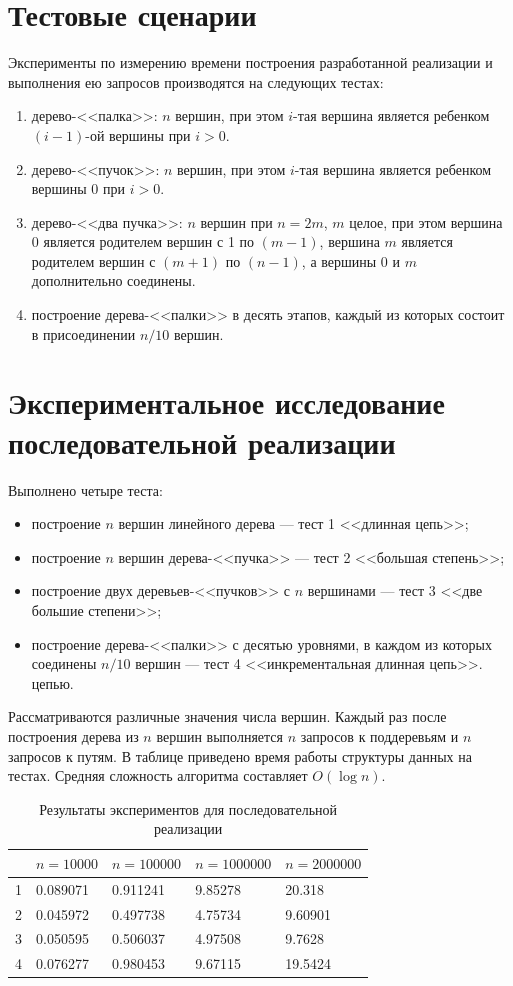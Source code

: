 \documentclass[specification,annotation]{itmo-student-thesis}
\begin{document}
\section{Тестовые сценарии}

Эксперименты по измерению времени построения разработанной реализации и выполнения ею запросов производятся на следующих тестах:
\begin{enumerate}
    \item дерево-<<палка>>: $n$ вершин, при этом $i$-тая вершина является ребенком $(i-1)$-ой вершины при $i > 0$.
    \item дерево-<<пучок>>: $n$ вершин, при этом $i$-тая вершина является ребенком вершины 0 при $i > 0$.
    \item дерево-<<два пучка>>: $n$ вершин при $n = 2m$, $m$ целое, при этом вершина 0 является родителем вершин с 1 по $(m-1)$,
          вершина $m$ является родителем вершин с $(m+1)$ по $(n-1)$, а вершины 0 и $m$ дополнительно соединены.
    \item построение дерева-<<палки>> в десять этапов, каждый из которых состоит в присоединении $n / 10$ вершин.
\end{enumerate}

\section{Экспериментальное исследование последовательной реализации}

Выполнено четыре теста: 
\begin{itemize}
\item построение $n$ вершин линейного дерева --- тест 1 <<длинная цепь>>; 
\item построение $n$ вершин дерева-<<пучка>> --- тест 2 <<большая степень>>; 
\item построение двух деревьев-<<пучков>> с $n$ вершинами --- тест 3  <<две большие степени>>; 
\item построение дерева-<<палки>> с десятью уровнями, в каждом из которых соединены $n/10$ вершин --- тест 4 <<инкрементальная длинная цепь>>.
цепью. 
\end{itemize}
Рассматриваются различные значения числа вершин. Каждый раз после построения дерева из $n$ вершин выполняется $n$ запросов к поддеревьям и $n$ запросов к путям. 
В таблице приведено время работы структуры данных на тестах. Средняя сложность алгоритма составляет $O (\log n)$.

\begin{table}[!ht]
\centering
\begin{tabular}{|l|l|l|l|l|}\hline
 & $n=10000$ & $n=100000$ & $n=1000000$ & $n=2000000$ \\\hline
1  & 0.089071 & 0.911241 & 9.85278 & 20.318 \\\hline
2  & 0.045972 & 0.497738 & 4.75734 & 9.60901 \\\hline
3  & 0.050595 & 0.506037 & 4.97508 & 9.7628 \\\hline
4  & 0.076277 & 0.980453 & 9.67115 & 19.5424 \\\hline
\end{tabular}
\caption{Результаты экспериментов для последовательной реализации}\label{tbl:results-seq}
\end{table}
\end{document}
